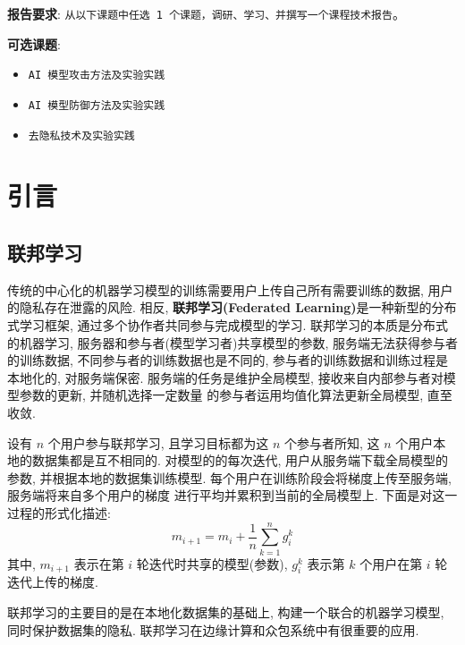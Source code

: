 \documentclass[../main.tex]{subfiles}
\begin{document}


\textbf{报告要求}: \texttt{从以下课题中任选 1 个课题，调研、学习、并撰写一个课程技术报告}。

\textbf{可选课题}:
\begin{itemize}
  \item \texttt{AI 模型攻击方法及实验实践}
  \item \texttt{AI 模型防御方法及实验实践}
  \item \texttt{去隐私技术及实验实践}
\end{itemize}

\section{引言}
\subsection{联邦学习}
传统的中心化的机器学习模型的训练需要用户上传自己所有需要训练的数据,
用户的隐私存在泄露的风险.
相反, \textbf{联邦学习(Federated Learning)}是一种新型的分布式学习框架, 通过多个协作者共同参与完成模型的学习.
联邦学习的本质是分布式的机器学习, 服务器和参与者(模型学习者)共享模型的参数,
服务端无法获得参与者的训练数据, 不同参与者的训练数据也是不同的, 参与者的训练数据和训练过程是本地化的,
对服务端保密.
服务端的任务是维护全局模型, 接收来自内部参与者对模型参数的更新, 并随机选择一定数量
的参与者运用均值化算法更新全局模型, 直至收敛.

设有 $ n $ 个用户参与联邦学习, 且学习目标都为这 $ n $ 个参与者所知,
这 $ n $ 个用户本地的数据集都是互不相同的. 对模型的的每次迭代,
用户从服务端下载全局模型的参数, 并根据本地的数据集训练模型.
每个用户在训练阶段会将梯度上传至服务端, 服务端将来自多个用户的梯度
进行平均并累积到当前的全局模型上. 下面是对这一过程的形式化描述:
\begin{equation}
  m_{i+1} = m_i + \frac{1}{n}\sum_{k=1}^{n}g_i^k
\end{equation}
其中, $ m_{i+1} $ 表示在第 $ i $ 轮迭代时共享的模型(参数),
$ g_i^k $ 表示第 $ k $ 个用户在第 $ i $ 轮迭代上传的梯度.

联邦学习的主要目的是在本地化数据集的基础上, 构建一个联合的机器学习模型,
同时保护数据集的隐私. 联邦学习在边缘计算和众包系统中有很重要的应用.
%
\end{document}
